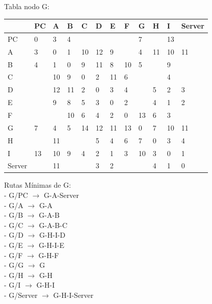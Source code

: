 \documentclass[a4paper]{article}
\begin{document}
\begin{table}[ht]
Tabla nodo G:\\
\begin{tabular}{|l|l|l|l|l|l|l|l|l|l|l|l|}
\hline
       & PC & A  & B & C & D & E & F & G & H & I  & Server \\ \hline
PC     & 0  & 3  & 4 &   &   &   &   & 7 &   & 13 &        \\ \hline
A      & 3  & 0  & 1 & 10& 12& 9 &   & 4 & 11& 10 & 11     \\ \hline
B      & 4  & 1  & 0 & 9 & 11& 8 & 10& 5 &   & 9  &        \\ \hline
C      &    & 10 & 9 & 0 & 2 & 11& 6 &   &   & 4  &        \\ \hline
D      &    & 12 & 11& 2 & 0 & 3 & 4 &   & 5 & 2  & 3      \\ \hline
E      &    & 9  & 8 & 5 & 3 & 0 & 2 &   & 4 & 1  & 2      \\ \hline
F      &    &    & 10& 6 & 4 & 2 & 0 & 13& 6 & 3  &        \\ \hline
G      & 7  & 4  & 5 & 14& 12& 11& 13& 0 & 7 & 10 & 11     \\ \hline
H      &    & 11 &   &   & 5 & 4 & 6 & 7 & 0 & 3  & 4      \\ \hline
I      & 13 & 10 & 9 & 4 & 2 & 1 & 3 & 10& 3 & 0  & 1      \\ \hline
Server &    & 11 &   &   & 3 & 2 &   &   & 4 & 1  & 0      \\ \hline
\end{tabular}

Rutas Mínimas de G:\\
-	G/PC  $\rightarrow$  G-A-Server\\
-	G/A  $\rightarrow$  G-A\\
-	G/B  $\rightarrow$  G-A-B\\
-	G/C  $\rightarrow$  G-A-B-C\\
-	G/D  $\rightarrow$  G-H-I-D\\
-	G/E  $\rightarrow$  G-H-I-E\\
-	G/F  $\rightarrow$  G-H-F\\
-	G/G  $\rightarrow$  G\\
-	G/H  $\rightarrow$ G-H\\
-	G/I  $\rightarrow$  G-H-I\\
-	G/Server  $\rightarrow$  G-H-I-Server\\
\end{table}


\clearpage
\end{document}
